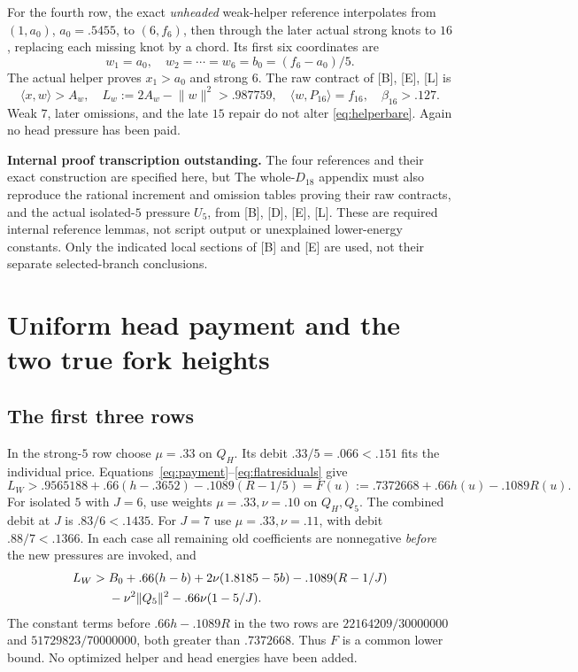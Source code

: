 \documentclass[11pt]{article}
\theoremstyle{definition}
\theoremstyle{remark}
\newcommand{\ip}[2]{\langle #1,#2\rangle}
\newcommand{\norm}[1]{\lVert #1\rVert}
\newcommand{\src}[1]{\textnormal{\textsf{[#1]}}}
\newcommand{\pending}[1]{\par\smallskip\noindent
  {\color{red!65!black}\textbf{Internal proof transcription outstanding.} #1}\par\smallskip}
\begin{document}
For the fourth row, the exact \emph{unheaded} weak-helper
reference interpolates from
\((1,a_0)\), \(a_0=.5455\), to \((6,f_6)\), then through
the later actual strong knots to \(16\), replacing each missing
knot by a chord. Its first six coordinates are
\begin{equation}
\label{eq:helperbare}
 w_1=a_0,\quad w_2=\cdots=w_6=b_0=(f_6-a_0)/5.
\end{equation}
The actual helper proves \(x_1>a_0\) and strong \(6\).
The raw contract of \src{B}, \src{E}, \src{L} is
\[
 \ip{x}{w}>A_w,\quad L_w:=2A_w-\norm{w}^2>.987759,\quad
 \ip{w}{P_{16}}=f_{16},\quad \beta_{16}>.127.
\]
Weak \(7\), later omissions, and the late \(15\) repair do not
alter \eqref{eq:helperbare}. Again no head pressure has been paid.
\pending{The four references and their exact construction are specified
here, but The whole-\(D_{18}\) appendix must also reproduce the rational increment and
omission tables proving their raw contracts, and the actual isolated-\(5\)
pressure \(U_5\), from \src{B}, \src{D}, \src{E}, \src{L}.
These are required internal reference lemmas, not script output or
unexplained lower-energy constants. Only the indicated local sections
of \src{B} and \src{E} are used, not their separate selected-branch
conclusions.}

\section{Uniform head payment and the two true fork heights}
\label{sec:uniformhead}

\subsection{The first three rows}
In the strong-\(5\) row choose \(\mu=.33\) on \(Q_H\).
Its debit \(.33/5=.066<.151\) fits the individual price.
Equations~\eqref{eq:payment}--\eqref{eq:flatresiduals} give
\[
 L_W>.9565188+.66(h-.3652)-.1089(R-1/5)
       =F(u):=.7372668+.66h(u)-.1089R(u).
\]
For isolated \(5\) with \(J=6\), use weights
\(\mu=.33,\nu=.10\) on \(Q_H,Q_5\).
The combined debit at \(J\) is \(.83/6<.1435\).
For \(J=7\) use \(\mu=.33,\nu=.11\), with debit
\(.88/7<.1366\). In each case all remaining old coefficients
are nonnegative \emph{before} the new pressures are invoked, and
\begin{align}
\label{eq:isolatedfunding}
 L_W>{}&B_0+.66(h-b)+2\nu(1.8185-5b)
       -.1089(R-1/J)\notag\\
 &-\nu^2\norm{Q_5}^2-.66\nu(1-5/J).
\end{align}
The constant terms before \(.66h-.1089R\) in the two rows are
\(22164209/30000000\) and \(51729823/70000000\), both
greater than \(.7372668\). Thus \(F\) is a common lower bound.
No optimized helper and head energies have been added.
\end{document}
